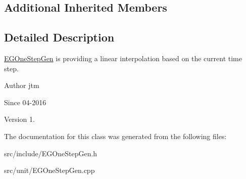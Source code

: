 \subsection*{Additional Inherited Members}


\subsection{Detailed Description}
\hyperlink{classunit_1_1EGOneStepGen}{E\-G\-One\-Step\-Gen} is providing a linear interpolation based on the current time step.

\begin{DoxyAuthor}{Author}
jtm 
\end{DoxyAuthor}
\begin{DoxySince}{Since}
04-\/2016 
\end{DoxySince}
\begin{DoxyVersion}{Version}
1. 
\end{DoxyVersion}


The documentation for this class was generated from the following files\-:\begin{DoxyCompactItemize}
\item 
src/include/E\-G\-One\-Step\-Gen.\-h\item 
src/unit/E\-G\-One\-Step\-Gen.\-cpp\end{DoxyCompactItemize}
